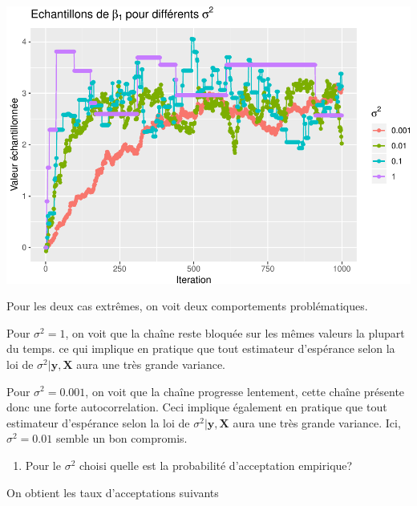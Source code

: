 \documentclass[]{article}
\newenvironment{Shaded}{\begin{snugshade}}{\end{snugshade}}
\newcommand{\CharTok}[1]{\textcolor[rgb]{0.31,0.60,0.02}{#1}}
\newcommand{\DataTypeTok}[1]{\textcolor[rgb]{0.13,0.29,0.53}{#1}}
\newcommand{\KeywordTok}[1]{\textcolor[rgb]{0.13,0.29,0.53}{\textbf{#1}}}
\newcommand{\NormalTok}[1]{#1}
\newcommand{\OperatorTok}[1]{\textcolor[rgb]{0.81,0.36,0.00}{\textbf{#1}}}
\newcommand{\OtherTok}[1]{\textcolor[rgb]{0.56,0.35,0.01}{#1}}
\newcommand{\StringTok}[1]{\textcolor[rgb]{0.31,0.60,0.02}{#1}}
\providecommand{\tightlist}{%
  \setlength{\itemsep}{0pt}\setlength{\parskip}{0pt}}
\newenvironment{Correction}%
  { \vspace{\baselineskip}\begin{mdframed}[backgroundcolor=my_green]}%
  {\end{mdframed}}
\begin{document}
\includegraphics{correction_bayes_mcmc_files/figure-latex/mcmc_multiple_sigma-1.pdf}

\begin{Correction}
Pour les deux cas extrêmes, on voit deux comportements problématiques. 

Pour $\sigma^2 = 1$, on voit que la chaîne reste bloquée sur les mêmes valeurs la plupart du temps. ce qui implique en pratique que tout estimateur d'espérance selon la loi de $\sigma^2\vert \mathbf{y}, \mathbf{X}$ aura une très grande variance. 

Pour $\sigma^2 = 0.001$, on voit que la chaîne progresse lentement, cette chaîne présente donc une forte autocorrelation. Ceci implique également en pratique que tout estimateur d'espérance selon la loi de $\sigma^2\vert \mathbf{y}, \mathbf{X}$ aura une très grande variance.
Ici, $\sigma^2 = 0.01$ semble un bon compromis.
\end{Correction}

\begin{enumerate}
\def\labelenumi{\arabic{enumi}.}
\setcounter{enumi}{3}
\tightlist
\item
  Pour le \(\sigma^2\) choisi quelle est la probabilité d'acceptation
  empirique?
\end{enumerate}

\begin{Correction}
On obtient les taux d'acceptations suivants
\end{Correction}

\begin{Shaded}
\end{Shaded}
\end{document}
